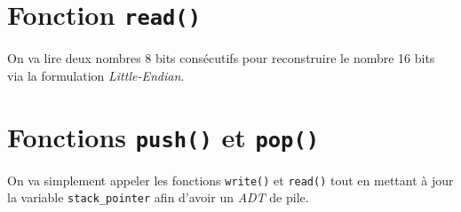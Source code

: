 \documentclass[a4paper,12pt]{article}
\begin{document}
\section*{Fonction \texttt{read()}}

On va lire deux nombres 8 bits consécutifs pour reconstruire le nombre 16 bits via la formulation \textit{Little-Endian}.

\section*{Fonctions \texttt{push()} et \texttt{pop()}}

On va simplement appeler les fonctions \texttt{write()} et \texttt{read()} tout en mettant à jour la variable \texttt{stack\_pointer} afin d’avoir un \textit{ADT} de pile.
\end{document}

